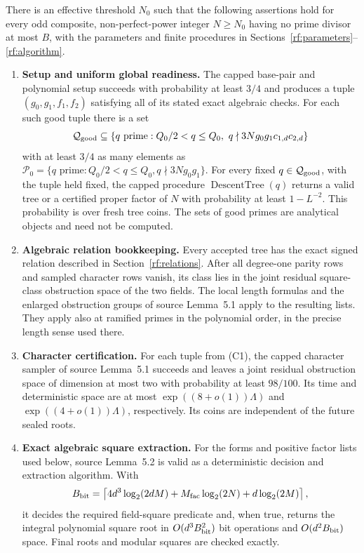 \begin{assumption}
\label{rf:assumption}
There is an effective threshold $N_0$ such that the following
assertions hold for every odd composite, non-perfect-power integer
$N\ge N_0$ having no prime divisor at most $B$, with the parameters
and finite procedures in Sections~\ref{rf:parameters}--\ref{rf:algorithm}.
\begin{enumerate}[label=\textup{(C\arabic*)},leftmargin=*]
\item \textbf{Setup and uniform global readiness.}
The capped base-pair and polynomial setup succeeds with probability
at least $3/4$ and produces a tuple
$(g_0,g_1,f_1,f_2)$ satisfying all of its stated exact algebraic checks.
For each such good tuple there is a set
\[
 \mathcal Q_{\rm good}\subseteq
 \{q\text{ prime}:Q_0/2<q\le Q_0,
                   \ q\nmid 3Ng_0g_1c_{1,d}c_{2,d}\}
\]
with at least $3/4$ as many elements as
$\mathcal P_0=\{q\text{ prime}:Q_0/2<q\le Q_0,
q\nmid3Ng_0g_1\}$.
For every fixed $q\in\mathcal Q_{\rm good}$, with the tuple held fixed,
the capped procedure $\operatorname{DescentTree}(q)$ returns a valid
tree or a certified proper factor of $N$ with probability at least
$1-L^{-2}$.  This probability is over fresh tree coins.  The sets of
good primes are analytical objects and need not be computed.

\item \textbf{Algebraic relation bookkeeping.}
Every accepted tree has the exact signed relation described in
Section~\ref{rf:relations}.  After all degree-one parity rows and
sampled character rows vanish, its class lies in the joint residual
square-class obstruction space of the two fields.  The local length
formulas and the enlarged obstruction groups of source Lemma~5.1
apply to the resulting lists.  They apply also at ramified primes
in the polynomial order, in the precise length sense used there.

\item \textbf{Character certification.}
For each tuple from \textup{(C1)}, the capped character sampler of
source Lemma~5.1 succeeds and leaves a joint residual obstruction
space of dimension at most two with probability at least $98/100$.
Its time and deterministic space are at most
$\exp((8+o(1))\Lambda)$ and $\exp((4+o(1))\Lambda)$,
respectively.  Its coins are independent of the future sealed roots.

\item \textbf{Exact algebraic square extraction.}
For the forms and positive factor lists used below, source
Lemma~5.2 is valid as a deterministic decision and extraction
algorithm.  With
\[
 B_{\rm bit}=\left\lceil
 4d^3\log_2(2dM)+M_{\rm fac}\log_2(2N)+d\log_2(2M)
 \right\rceil,
\]
it decides the required field-square predicate and, when true,
returns the integral polynomial square root in
$O(d^3B_{\rm bit}^2)$ bit operations and
$O(d^2B_{\rm bit})$ space.  Final roots and modular squares are
checked exactly.


\end{enumerate}
\end{assumption}
